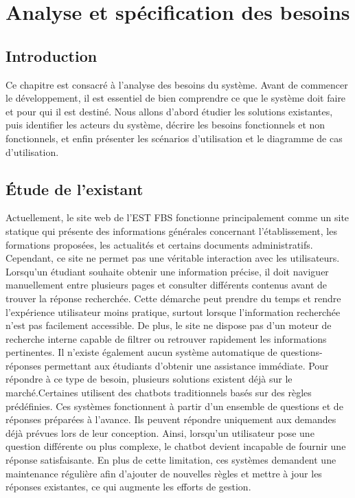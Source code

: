 \documentclass[12pt, a4paper, twoside]{report}
\begin{document}
\chapter{Analyse et spécification des besoins}

\section{Introduction}
Ce chapitre est consacré à l'analyse des besoins du système. Avant de commencer le développement, il est essentiel de bien comprendre ce que le système doit faire et pour qui il est destiné. Nous allons d'abord étudier les solutions existantes, puis identifier les acteurs du système, décrire les besoins fonctionnels et non fonctionnels, et enfin présenter les scénarios d'utilisation et le diagramme de cas d'utilisation.

\section{Étude de l'existant}
Actuellement, le site web de l’EST FBS fonctionne principalement comme un site \newline statique qui présente des informations générales concernant l’établissement, les formations proposées, les actualités et certains documents administratifs. Cependant, ce site ne \newline permet pas une véritable interaction avec les utilisateurs. Lorsqu’un étudiant souhaite obtenir une information précise, il doit naviguer manuellement entre plusieurs pages et consulter différents contenus avant de trouver la réponse recherchée. Cette démarche peut prendre du temps et rendre l’expérience utilisateur moins pratique, surtout lorsque \newline l’information recherchée n’est pas facilement accessible. De plus, le site ne dispose pas d’un moteur de recherche interne capable de filtrer ou retrouver rapidement les informations pertinentes. Il n’existe également aucun système automatique de questions-réponses permettant aux étudiants d’obtenir une assistance immédiate.
\newline
Pour répondre à ce type de besoin, plusieurs solutions existent déjà sur le marché.\newline Certaines utilisent des chatbots traditionnels basés sur des règles prédéfinies. Ces systèmes fonctionnent à partir d’un ensemble de questions et de réponses préparées à l’avance. Ils peuvent répondre uniquement aux demandes déjà prévues lors de leur conception. Ainsi, lorsqu’un utilisateur pose une question différente ou plus complexe, le chatbot devient incapable de fournir une réponse satisfaisante. En plus de cette limitation, ces systèmes demandent une maintenance régulière afin d’ajouter de nouvelles règles et mettre à jour les réponses existantes, ce qui augmente les efforts de gestion.
\newpage
\end{document}
